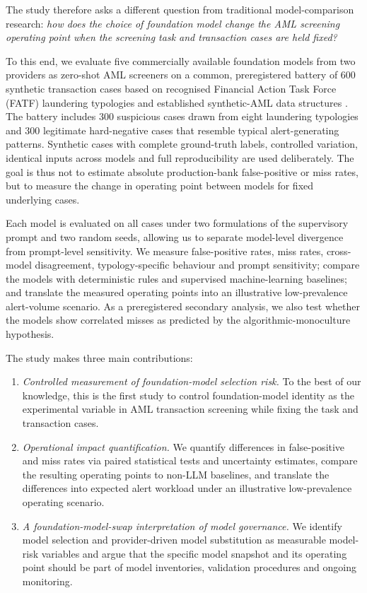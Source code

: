 \documentclass[pdflatex,sn-basic,Numbered]{sn-jnl}
\begin{document}
The study therefore asks a different question from traditional model-comparison research: \emph{how does the choice of foundation model change the AML screening operating point when the screening task and transaction cases are held fixed?}

To this end, we evaluate five commercially available foundation models from two providers as zero-shot AML screeners on a common, preregistered battery of 600 synthetic transaction cases based on recognised Financial Action Task Force (FATF) laundering typologies and established synthetic-AML data structures \cite{samld,weber2018}. The battery includes 300 suspicious cases drawn from eight laundering typologies and 300 legitimate hard-negative cases that resemble typical alert-generating patterns. Synthetic cases with complete ground-truth labels, controlled variation, identical inputs across models and full reproducibility are used deliberately. The goal is thus not to estimate absolute production-bank false-positive or miss rates, but to measure the change in operating point between models for fixed underlying cases.

Each model is evaluated on all cases under two formulations of the supervisory prompt and two random seeds, allowing us to separate model-level divergence from prompt-level sensitivity. We measure false-positive rates, miss rates, cross-model disagreement, typology-specific behaviour and prompt sensitivity; compare the models with deterministic rules and supervised machine-learning baselines; and translate the measured operating points into an illustrative low-prevalence alert-volume scenario. As a preregistered secondary analysis, we also test whether the models show correlated misses as predicted by the algorithmic-monoculture hypothesis.

The study makes three main contributions:

\begin{enumerate}
\item \emph{Controlled measurement of foundation-model selection risk.} To the best of our knowledge, this is the first study to control foundation-model identity as the experimental variable in AML transaction screening while fixing the task and transaction cases.
\item \emph{Operational impact quantification.} We quantify differences in false-positive and miss rates via paired statistical tests and uncertainty estimates, compare the resulting operating points to non-LLM baselines, and translate the differences into expected alert workload under an illustrative low-prevalence operating scenario.
\item \emph{A foundation-model-swap interpretation of model governance.} We identify model selection and provider-driven model substitution as measurable model-risk variables and argue that the specific model snapshot and its operating point should be part of model inventories, validation procedures and ongoing monitoring.
\end{enumerate}
\end{document}
